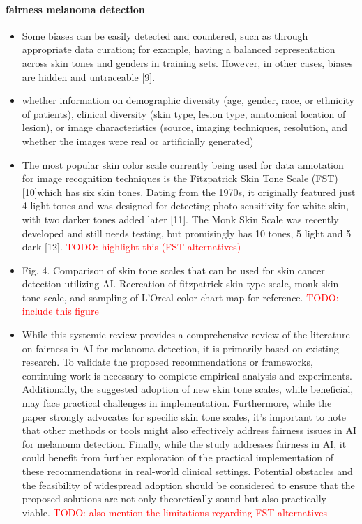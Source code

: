 \documentclass[12pt, a4paper, oneside]{book}   	%
\renewcommand{\todo}[1]{\textcolor{red}{TODO: #1}}
\begin{document}
		\paragraph{fairness melanoma detection}
		\begin{itemize}
			\item Some biases can be easily detected and countered, such as through appropriate data curation; for example, having a balanced representation across skin tones and genders in training sets. However, in other cases, biases are hidden and untraceable [9]. \autocite{Montoya_2025}
			\item whether information on demographic diversity (age, gender, race, or ethnicity of patients), clinical diversity (skin type, lesion type, anatomical location of lesion), or image characteristics (source, imaging techniques, resolution, and whether the images were real or artificially generated) \autocite{Montoya_2025}
			\item The most popular skin color scale currently being used for data annotation for image recognition techniques is the Fitzpatrick Skin Tone Scale (FST) [10]which has six skin tones. Dating from the 1970s, it originally featured just 4 light tones and was designed for detecting photo sensitivity for white skin, with two darker tones added later [11]. The Monk Skin Scale was recently developed and still needs testing, but promisingly has 10 tones, 5 light and 5 dark [12].\autocite{Montoya_2025} \todo{highlight this (FST alternatives)}
			\item Fig. 4. Comparison of skin tone scales that can be used for skin cancer detection utilizing AI. Recreation of fitzpatrick skin type scale, monk skin tone scale, and sampling of L’Oreal color chart map for reference. \autocite{Montoya_2025} \todo{include this figure}
			\item While this systemic review provides a comprehensive review of the literature on fairness in AI for melanoma detection, it is primarily based on existing research. To validate the proposed recommendations or frameworks, continuing work is necessary to complete empirical analysis and experiments. Additionally, the suggested adoption of new skin tone scales, while beneficial, may face practical challenges in implementation. Furthermore, while the paper strongly advocates for specific skin tone scales, it’s important to note that other methods or tools might also effectively address fairness issues in AI for melanoma detection. Finally, while the study addresses fairness in AI, it could benefit from further exploration of the practical implementation of these recommendations in real-world clinical settings. Potential obstacles and the feasibility of widespread adoption should be considered to ensure that the proposed solutions are not only theoretically sound but also practically viable. \autocite{Montoya_2025} \todo{also mention the limitations regarding FST alternatives}

\end{itemize}
\end{document}
